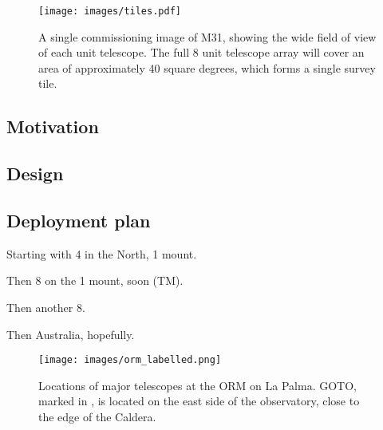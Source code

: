\begin{colsection}
\begin{colsection}
\begin{figure}[t]
    \begin{center}
        \texttt{[image: images/tiles.pdf]}
    \end{center}
    \caption[M31]{
        A single commissioning image of M31, showing the wide field of view of each unit telescope. The full 8 unit telescope array will cover an area of approximately 40 square degrees, which forms a single survey tile.
    }\label{fig:tiles}
\end{figure}

\end{colsection}


\subsection{Motivation}
\label{sec:goto_motivation}
\begin{colsection}


\end{colsection}


\subsection{Design}
\label{sec:goto_design}
\begin{colsection}


\end{colsection}


\newpage
\subsection{Deployment plan}
\label{sec:goto_expansion}
\begin{colsection}


Starting with 4 in the North, 1 mount.

Then 8 on the 1 mount, soon (TM).

Then another 8.

Then Australia, hopefully.

\newpage

\begin{figure}[p]
    \begin{center}
        \texttt{[image: images/orm\_labelled.png]}
    \end{center}
    \caption[Locations of major telescopes on La Palma]{
        Locations of major telescopes at the ORM on La Palma. GOTO, marked in , is located on the east side of the observatory, close to the edge of the Caldera.
    }\label{fig:orm}
\end{figure}


\end{colsection}
\end{colsection}
